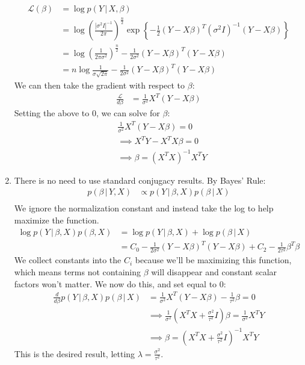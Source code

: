 \documentclass[submit]{harvardml}
\newcommand{\given}{\,|\,}
\theoremstyle{plain}
\begin{document}
\begin{enumerate}[label=(\alph*)]
\begin{align*}
\mathcal{L}(\beta) &= \log p(Y \given X, \beta) \\
&= \log \left(\frac{|\sigma^2 I|^{-1}}{2\pi}\right)^{\frac{n}{2}} \exp \left\{-\frac{1}{2} (Y - X\beta)^T(\sigma^2 I)^{-1}(Y-X\beta) \right\} \\
&= \log \left(\frac{1}{2\pi\sigma^2}\right)^{\frac{n}{2}} - \frac{1}{2\sigma^2}(Y-X\beta)^T(Y -X\beta) \\
&= n \log \frac{1}{\sigma\sqrt{2\pi}} - \frac{1}{2\sigma^2}(Y- X\beta)^T(Y - X\beta)
\end{align*}
We can then take the gradient with respect to $\beta$:
\begin{align*}
\frac{\mathcal{L}}{d\beta} &= \frac{1}{\sigma^2}X^T(Y - X\beta)
\end{align*}
Setting the above to $0$, we can solve for $\beta$:
\begin{align*}
&\frac{1}{\sigma^2}X^T(Y - X\beta) = 0 \\
&\implies X^TY - X^TX\beta = 0 \\
&\implies \beta = (X^TX)^{-1}X^TY
\end{align*}

\item There is no need to use standard conjugacy results. By Bayes' Rule:
\begin{align*}
p(\beta \given Y,X) &\propto p(Y \given \beta,X) p(\beta \given X) \\
\end{align*}
We ignore the normalization constant and instead take the log to help maximize the function.
\begin{align*}
\log p(Y \given \beta, X)p(\beta, X) &= \log p(Y \given \beta, X) + \log p(\beta \given X) \\
&= C_0 - \frac{1}{2\sigma^2}(Y - X\beta)^T(Y - X\beta) + C_2 - \frac{1}{2\tau^2}\beta^T\beta
\end{align*}
We collect constants into the $C_i$ because we'll be maximizing this function, which means terms not containing $\beta$ will disappear and constant scalar factors won't matter. We now do this, and set equal to $0$:
\begin{align*}
\frac{d}{d\beta} p(Y \given \beta,X)p(\beta \given X) &= \frac{1}{\sigma^2}X^T(Y - X\beta) - \frac{1}{\tau^2}\beta = 0\\
&\implies \frac{1}{\sigma^2}(X^TX + \frac{\sigma^2}{\tau^2}I)\beta = \frac{1}{\sigma^2}X^TY \\
&\implies \beta = (X^TX + \frac{\sigma^2}{\tau^2}I)^{-1}X^TY
\end{align*}
This is the desired result, letting $\lambda = \frac{\sigma^2}{\tau^2}$.


\end{enumerate}
\end{document}
